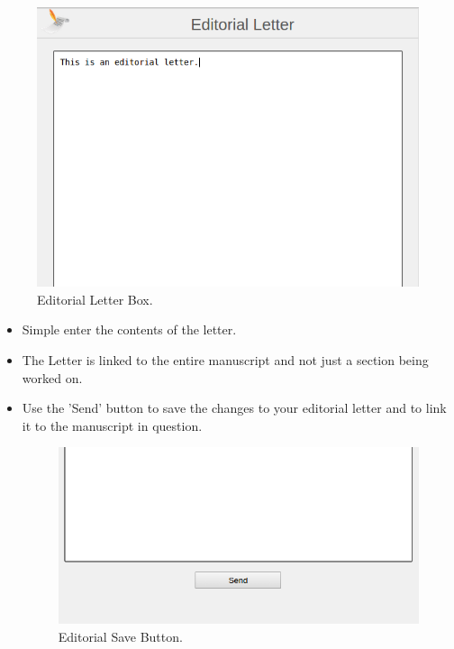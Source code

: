 \begin{figure}[h]
			\centering
			\includegraphics[scale=0.6]{images/EditorialLetter.png}
			\caption{Editorial Letter Box.}
		\end{figure} 
		
		\begin{itemize}
			\item Simple enter the contents of the letter.
			\item The Letter is linked to the entire manuscript and not just a section being worked on.
			\item Use the 'Send' button to save the changes to your editorial letter and to link it to the manuscript in question.
			
			\begin{figure}[h]
			\centering
			\includegraphics[scale=0.4]{images/SendEditorialLetter.png}
			\caption{Editorial Save Button.}
		\end{figure}  
		\end{itemize}